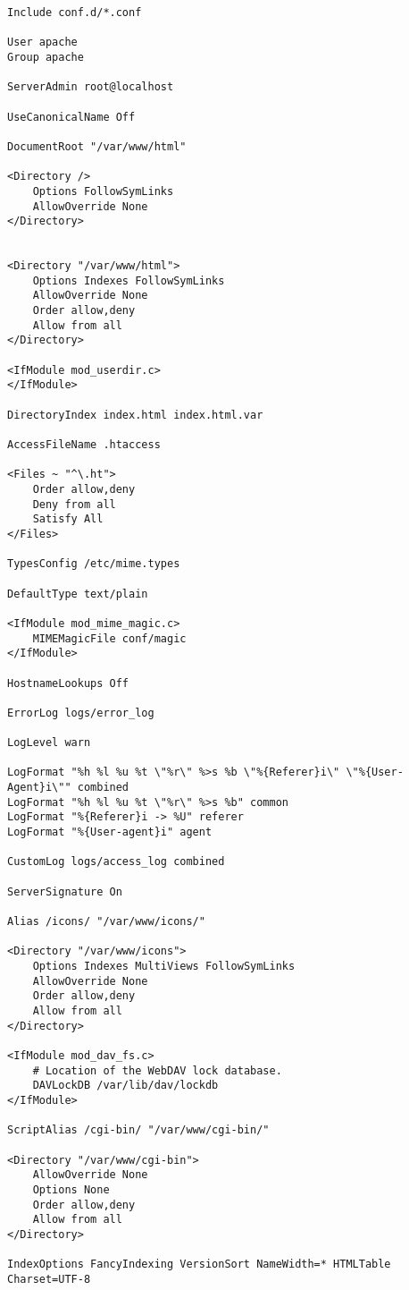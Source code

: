 \begin{code}
\begin{lstlisting}
Include conf.d/*.conf

User apache
Group apache

ServerAdmin root@localhost

UseCanonicalName Off

DocumentRoot "/var/www/html"

<Directory />
    Options FollowSymLinks
    AllowOverride None
</Directory>


<Directory "/var/www/html">
    Options Indexes FollowSymLinks
    AllowOverride None
    Order allow,deny
    Allow from all
</Directory>

<IfModule mod_userdir.c>
</IfModule>

DirectoryIndex index.html index.html.var

AccessFileName .htaccess

<Files ~ "^\.ht">
    Order allow,deny
    Deny from all
    Satisfy All
</Files>

TypesConfig /etc/mime.types

DefaultType text/plain

<IfModule mod_mime_magic.c>
    MIMEMagicFile conf/magic
</IfModule>

HostnameLookups Off

ErrorLog logs/error_log

LogLevel warn

LogFormat "%h %l %u %t \"%r\" %>s %b \"%{Referer}i\" \"%{User-Agent}i\"" combined
LogFormat "%h %l %u %t \"%r\" %>s %b" common
LogFormat "%{Referer}i -> %U" referer
LogFormat "%{User-agent}i" agent

CustomLog logs/access_log combined

ServerSignature On

Alias /icons/ "/var/www/icons/"

<Directory "/var/www/icons">
    Options Indexes MultiViews FollowSymLinks
    AllowOverride None
    Order allow,deny
    Allow from all
</Directory>

<IfModule mod_dav_fs.c>
    # Location of the WebDAV lock database.
    DAVLockDB /var/lib/dav/lockdb
</IfModule>

ScriptAlias /cgi-bin/ "/var/www/cgi-bin/"

<Directory "/var/www/cgi-bin">
    AllowOverride None
    Options None
    Order allow,deny
    Allow from all
</Directory>

IndexOptions FancyIndexing VersionSort NameWidth=* HTMLTable Charset=UTF-8


\end{lstlisting}
\end{code}
